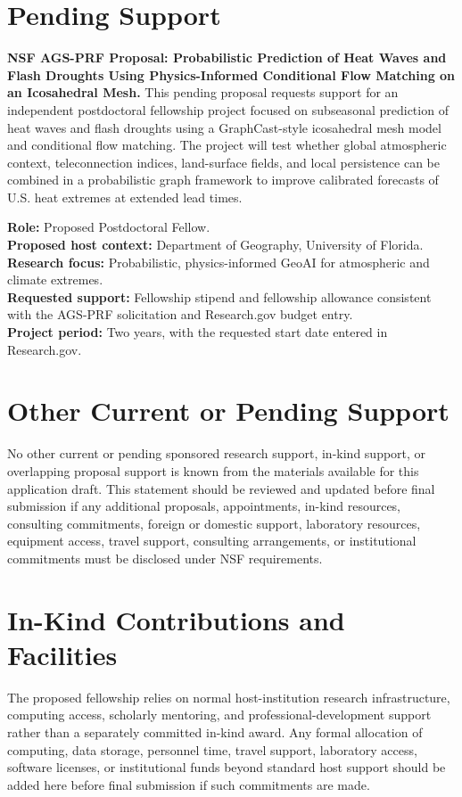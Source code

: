 \documentclass[11pt,letterpaper]{article}
\begin{document}
\section*{Pending Support}
\textbf{NSF AGS-PRF Proposal: Probabilistic Prediction of Heat Waves and Flash Droughts Using Physics-Informed Conditional Flow Matching on an Icosahedral Mesh.} This pending proposal requests support for an independent postdoctoral fellowship project focused on subseasonal prediction of heat waves and flash droughts using a GraphCast-style icosahedral mesh model and conditional flow matching. The project will test whether global atmospheric context, teleconnection indices, land-surface fields, and local persistence can be combined in a probabilistic graph framework to improve calibrated forecasts of U.S. heat extremes at extended lead times.

\noindent\textbf{Role:} Proposed Postdoctoral Fellow.\\
\textbf{Proposed host context:} Department of Geography, University of Florida.\\
\textbf{Research focus:} Probabilistic, physics-informed GeoAI for atmospheric and climate extremes.\\
\textbf{Requested support:} Fellowship stipend and fellowship allowance consistent with the AGS-PRF solicitation and Research.gov budget entry.\\
\textbf{Project period:} Two years, with the requested start date entered in Research.gov.

\section*{Other Current or Pending Support}
No other current or pending sponsored research support, in-kind support, or overlapping proposal support is known from the materials available for this application draft. This statement should be reviewed and updated before final submission if any additional proposals, appointments, in-kind resources, consulting commitments, foreign or domestic support, laboratory resources, equipment access, travel support, consulting arrangements, or institutional commitments must be disclosed under NSF requirements.

\section*{In-Kind Contributions and Facilities}
The proposed fellowship relies on normal host-institution research infrastructure, computing access, scholarly mentoring, and professional-development support rather than a separately committed in-kind award. Any formal allocation of computing, data storage, personnel time, travel support, laboratory access, software licenses, or institutional funds beyond standard host support should be added here before final submission if such commitments are made.
\end{document}

